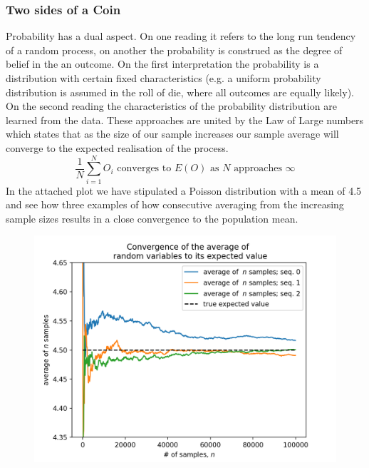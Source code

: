 \documentclass[10pt,a4paper,notitlepage,twocolumn]{article}
\begin{document}
\subsubsection*{Two sides of a Coin}
Probability has a dual aspect. On one reading it refers to the long run tendency of a random process, on another the probability is construed as the degree of belief in the an outcome. On the first interpretation the probability is a distribution with certain fixed characteristics (e.g. a uniform probability distribution is assumed in the roll of die, where all outcomes are equally likely). On the second reading the characteristics of the probability distribution are learned from the data. These approaches are united by the Law of Large numbers which states that as the size of our sample increases our sample average will converge to the expected realisation of the process.
$$  \frac{1}{N} \sum_{i = 1}^{N} O_{i} \text{ converges to }  E(O) \text{ as } N \text{ approaches } \infty $$ In the attached plot we have stipulated a Poisson distribution with a mean of 4.5 and see how three examples of how consecutive averaging from the increasing sample sizes results in a close convergence to the population mean.
\begin{figure}[H]
  \includegraphics[width=\linewidth]{./Plots/convergence_of_law_of_large_numbers.png}
\end{figure}
\end{document}
